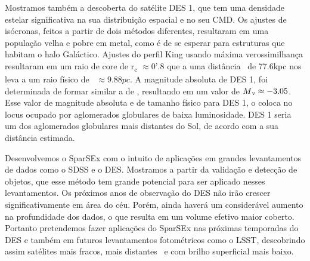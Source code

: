 \documentclass[
	12pt,				%
	openany,			%
	oneside,			%
	a4paper,			%
	english,			%
	brazil				%
	]{abntex2}
\begin{document}
Mostramos também a descoberta do satélite DES 1, que tem uma densidade estelar significativa na sua distribuição espacial e no seu CMD. Os ajustes de isócronas, feitos a partir de dois métodos diferentes, resultaram em uma população velha e pobre em metal, como é de se esperar para estruturas que habitam o halo Galáctico. Ajustes do perfil King usando máxima verossimilhança resultaram em um raio de core de r\textsubscript{c} $\approx 0’.8$ que a uma distância  de 77.6kpc nos leva a um raio físico de  $\approx 9.88 pc$. A magnitude absoluta de DES 1, foi determinada de formar similar a de \cite{2015ApJ...805..130K}, resultando em um valor de $M\textsubscript{v} \approx -3.05$. Esse valor de magnitude absoluta e de tamanho físico para DES 1, o coloca no locus ocupado por aglomerados globulares de baixa luminosidade. DES 1 seria um dos aglomerados globulares mais distantes do Sol, de acordo com a sua distância estimada. \par
Desenvolvemos o SparSEx com o intuito de aplicações em grandes levantamentos de dados como o SDSS e o DES. Mostramos a partir da validação e detecção de objetos, que esse método tem grande potencial para ser aplicado nesses levantamentos. Os próximos anos de observação do DES não irão crescer significativamente em área do céu. Porém, ainda haverá um considerável aumento na profundidade dos dados, o que resulta em um volume efetivo maior coberto. Portanto pretendemos fazer aplicações do SparSEx nas próximas temporadas do DES e também em futuros levantamentos fotométricos como o LSST, descobrindo assim satélites mais fracos, mais distantes  e com brilho superficial mais baixo.



\postextual




%
%



\printindex
\end{document}
